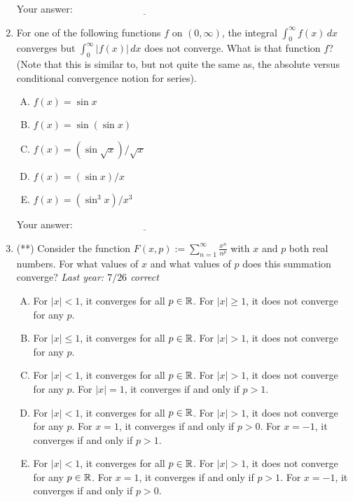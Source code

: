 \documentclass[10pt]{amsart}
\begin{document}
\begin{enumerate}
  \vspace{0.1in}
  Your answer: $\underline{\qquad\qquad\qquad\qquad\qquad\qquad\qquad}$
  \vspace{0.15in}

\item For one of the following functions $f$ on $(0,\infty)$, the
  integral $\int_0^\infty f(x) \, dx$ converges but $\int_0^\infty
  |f(x)| \, dx$ does not converge. What is that function $f$? (Note
  that this is similar to, but not quite the same as, the absolute
  versus conditional convergence notion for series).

  \begin{enumerate}[(A)]
  \item $f(x) = \sin x$
  \item $f(x) = \sin(\sin x)$
  \item $f(x) = (\sin \sqrt{x})/\sqrt{x}$
  \item $f(x) = (\sin x)/x$
  \item $f(x) = (\sin^3x)/x^3$
  \end{enumerate}

  \vspace{0.1in}
  Your answer: $\underline{\qquad\qquad\qquad\qquad\qquad\qquad\qquad}$
  \vspace{0.15in}

\item (**) Consider the function $F(x,p) := \sum_{n=1}^\infty
  \frac{x^n}{n^p}$ with $x$ and $p$ both real numbers. For what values
  of $x$ and what values of $p$ does this summation converge? {\em
  Last year: $7/26$ correct}
  \begin{enumerate}[(A)]
  \item For $|x| < 1$, it converges for all $p \in \mathbb{R}$. For $|x| \ge
    1$, it does not converge for any $p$.
  \item For $|x| \le 1$, it converges for all $p \in \mathbb{R}$. For $|x| >
    1$, it does not converge for any $p$.
  \item For $|x| < 1$, it converges for all $p \in \mathbb{R}$. For $|x| > 1$,
    it does not converge for any $p$. For $|x| = 1$, it converges if
    and only if $p > 1$.
  \item For $|x| < 1$, it converges for all $p \in \mathbb{R}$. For $|x| > 1$,
    it does not converge for any $p$. For $x = 1$, it converges
    if and only if $p > 0$. For $x = -1$, it converges if and only if
    $p > 1$.
  \item For $|x| < 1$, it converges for all $p \in \mathbb{R}$. For $|x| > 1$,
    it does not converge for any $p \in \mathbb{R}$. For $x = 1$, it converges
    if and only if $p > 1$. For $x = -1$, it converges if and only if
    $p > 0$.
  \end{enumerate}


\end{enumerate}
\end{document}
